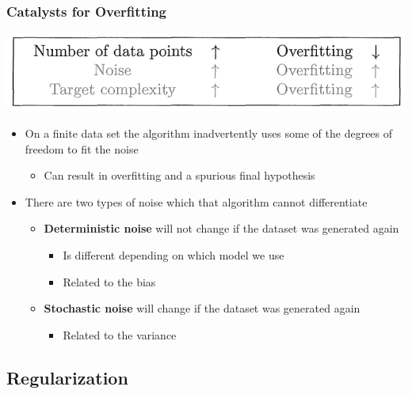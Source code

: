 \documentclass[11pt]{article}
\begin{document}
\subsubsection{Catalysts for Overfitting}
\label{sec:org4d73b5f}
\begin{center}
\includegraphics[width=.9\linewidth]{Overfitting (4)/screenshot_2018-09-17_10-16-04.png}
\end{center}
\begin{itemize}
\item On a finite data set the algorithm inadvertently uses some of the degrees of freedom to fit the noise
\begin{itemize}
\item Can result in overfitting and a spurious final hypothesis
\end{itemize}

\item There are two types of noise which that algorithm cannot differentiate
\begin{itemize}
\item \textbf{Deterministic noise} will not change if the dataset was generated again
\begin{itemize}
\item Is different depending on which model we use
\item Related to the bias
\end{itemize}
\item \textbf{Stochastic noise} will change if the dataset was generated again
\begin{itemize}
\item Related to the variance
\end{itemize}
\end{itemize}
\end{itemize}

\subsection{Regularization}
\label{sec:org3cdf7d4}
\end{document}
